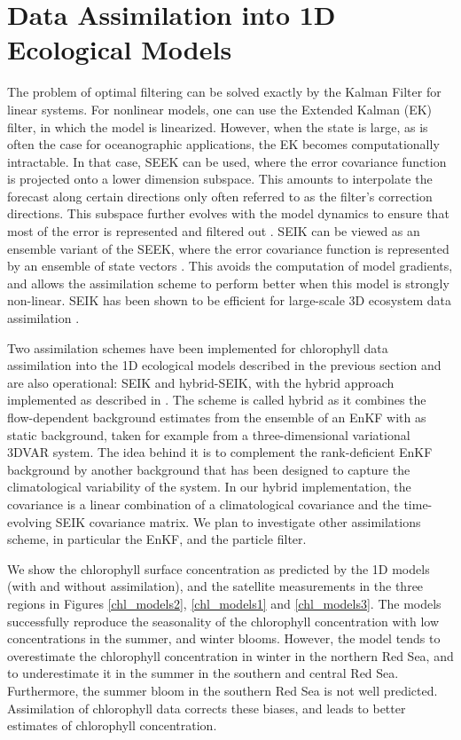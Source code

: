 \section{Data Assimilation into 1D Ecological Models}

The problem of optimal filtering can be solved exactly by the Kalman Filter for
linear systems. For nonlinear models, one can use the Extended Kalman (EK)
filter, in which the model is linearized.  However, when the state is large, as
is often the case for oceanographic applications, the EK becomes
computationally intractable. In that case, SEEK can be used, where the error
covariance function is projected onto a lower dimension subspace. This amounts
to interpolate the forecast along certain directions only often referred to as
the filter's correction directions.  This subspace further evolves with the
model dynamics to ensure that most of the error is represented and filtered out
\citep{Pham1998, Hoteit2002}. SEIK can be viewed as an ensemble variant of the
SEEK, where the error covariance function is represented by an ensemble of
state vectors \citep{Hoteit2002}. This avoids the computation of
model gradients, and allows the assimilation scheme to perform better when this
model is strongly non-linear. SEIK has been shown to be efficient for
large-scale 3D ecosystem data assimilation \citep{Triantafyllou2003}.

Two assimilation schemes have been implemented for chlorophyll data assimilation into the 1D ecological models described in the previous section and
are also operational: SEIK and hybrid-SEIK, with the hybrid approach implemented as
described in \citet{Hamill2000}. The scheme is called hybrid as it combines the
flow-dependent background estimates from the ensemble of an EnKF with as static
background, taken for example from a three-dimensional variational 3DVAR
system. The idea behind it is to complement the rank-deficient EnKF background by
another background that has been designed to capture the climatological
variability of the system.  In our hybrid implementation, the covariance is a
linear combination of a climatological covariance and the time-evolving SEIK
covariance matrix. We plan to investigate other assimilations scheme, in
particular the EnKF, and the particle filter.

We show the chlorophyll surface concentration as predicted by the 1D models (with and
without assimilation), and the satellite measurements in the three regions in
Figures \ref{chl_models2}, \ref{chl_models1} and \ref{chl_models3}.  The models
successfully reproduce the seasonality of the chlorophyll concentration with low
concentrations in the summer, and winter blooms. However, the model tends to
overestimate the chlorophyll concentration in winter in the northern Red Sea,
and to underestimate it in the summer in the southern and central Red Sea.
Furthermore, the summer bloom in the southern Red Sea is not well predicted.
Assimilation of chlorophyll data corrects these biases, and leads to better
estimates of chlorophyll concentration.

